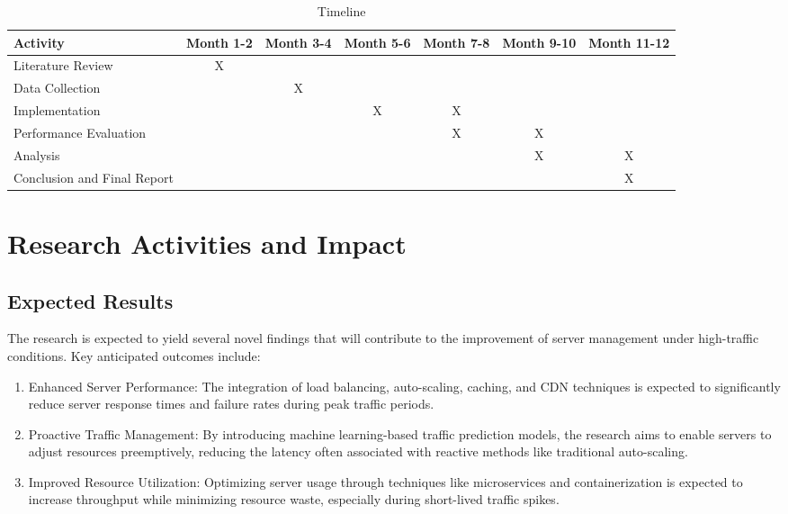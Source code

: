 \documentclass[a4paper, 12pt]{article}
\begin{document}
\begin{table}[h]
\centering
\caption{Timeline}
\begin{tabular}{|p{3cm}|c|c|c|c|c|c|}
\hline
{Activity} & {Month 1-2} & {Month 3-4} & {Month 5-6} & {Month 7-8} & {Month 9-10} & {Month 11-12} \\
\hline
Literature Review & X &  &  &  &  &  \\
\hline
Data Collection &  & X &  &  &  &  \\
\hline
Implementation &  &  & X & X &  &  \\
\hline
Performance Evaluation &  &  &  & X & X &  \\
\hline
Analysis &  &  &  &  & X & X \\
\hline
Conclusion and Final Report &  &  &  &  &  & X \\
\hline
\end{tabular}
\end{table}



\section{Research Activities and Impact}


\subsection{Expected Results}

The research is expected to yield several novel findings that will contribute to the improvement of server management under high-traffic conditions. Key anticipated outcomes include:
\\
\begin{enumerate}
    \item Enhanced Server Performance: The integration of load balancing, auto-scaling, caching, and CDN techniques is expected to significantly reduce server response times and failure rates during peak traffic periods.
    \item Proactive Traffic Management: By introducing machine learning-based traffic prediction models, the research aims to enable servers to adjust resources preemptively, reducing the latency often associated with reactive methods like traditional auto-scaling.
    \item Improved Resource Utilization: Optimizing server usage through techniques like microservices and containerization is expected to increase throughput while minimizing resource waste, especially during short-lived traffic spikes.
    
\end{enumerate}
\end{document}
